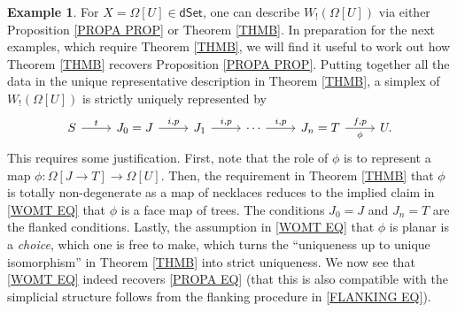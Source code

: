 \documentclass[a4paper,10pt]{article}%
\numberwithin{equation}{section}
\numberwithin{figure}{section}
\theoremstyle{definition} %
\newtheorem{example}[equation]{Example}%
\begin{document}
\begin{example}\label{WREP_EX}
	For $X=\Omega[U]\in \mathsf{dSet}$,
	one can describe $W_!(\Omega[U])$
	via either Proposition \ref{PROPA PROP} or Theorem \ref{THMB}.
	In preparation for the next examples, 
	which require Theorem \ref{THMB},
	we will find it useful to work out how 
	Theorem \ref{THMB} recovers Proposition \ref{PROPA PROP}. 
	Putting together all the data in the unique representative description
	in Theorem \ref{THMB},
	a simplex of $W_!(\Omega[U])$ is strictly uniquely represented by
\begin{equation}\label{WOMT EQ}
\begin{tikzcd}
	S \ar{r}{t} &
	J_0 = J \ar{r}{i,p} &
	J_1 \ar{r}{i,p} &
	\cdots \ar{r}{i,p} &
	J_n = T \ar{r}{f,p}[swap]{\phi} &
	U.
\end{tikzcd}
\end{equation}
This requires some justification. 
First, note that the role of $\phi$ is to represent a map
$\phi \colon \Omega[J\to T] \to \Omega[U]$. 
Then, the requirement in Theorem \ref{THMB} that $\phi$ is totally non-degenerate 
as a map of necklaces reduces to the implied claim in 
\eqref{WOMT EQ} that $\phi$ is a face map of trees.
The conditions $J_0 =J$ and $J_n = T$ are the flanked conditions.
Lastly, the assumption in \eqref{WOMT EQ}
that $\phi$ is planar is a \emph{choice}, 
which one is free to make, which turns the 
``uniqueness up to unique isomorphism''
in Theorem \ref{THMB} into strict uniqueness.
We now see that \eqref{WOMT EQ} indeed recovers \eqref{PROPA EQ}
(that this is also compatible with the simplicial structure follows from the flanking procedure in \eqref{FLANKING EQ}).


\end{example}
\end{document}
